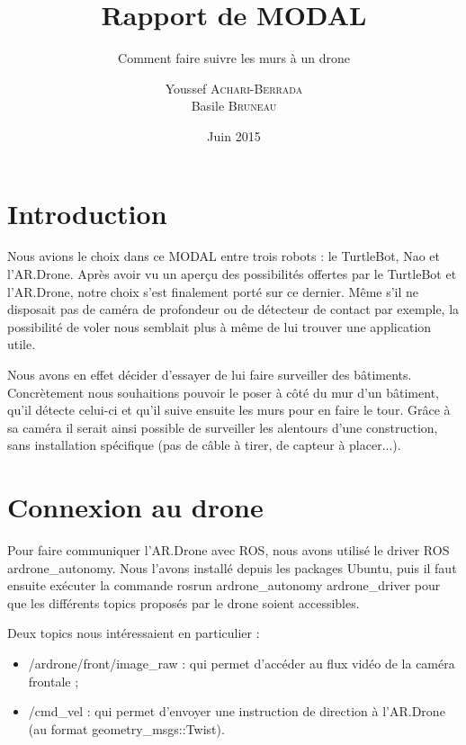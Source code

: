 \documentclass[titlepage,11pt,a4paper]{article}
\title{Rapport de MODAL}
\subtitle{Comment faire suivre les murs à un drone}
\author{Youssef \textsc{Achari-Berrada}\\
Basile \textsc{Bruneau}}
\date{Juin 2015}
\begin{document}
\maketitle



\section*{Introduction}
Nous avions le choix dans ce MODAL entre trois robots : le TurtleBot, Nao et l'AR.Drone. Après avoir vu un aperçu des possibilités offertes par le TurtleBot et l'AR.Drone, notre choix s'est finalement porté sur ce dernier. Même s'il ne disposait pas de caméra de profondeur ou de détecteur de contact par exemple, la possibilité de voler nous semblait plus à même de lui trouver une application utile.

Nous avons en effet décider d'essayer de lui faire surveiller des bâtiments. Concrètement nous souhaitions pouvoir le poser à côté du mur d'un bâtiment, qu'il détecte celui-ci et qu'il suive ensuite les murs pour en faire le tour. Grâce à sa caméra il serait ainsi possible de surveiller les alentours d'une construction, sans installation spécifique (pas de câble à tirer, de capteur à placer...).

\section{Connexion au drone}
Pour faire communiquer l'AR.Drone avec ROS, nous avons utilisé le driver ROS ardrone\_autonomy. Nous l'avons installé depuis les packages Ubuntu, puis il faut ensuite exécuter la commande rosrun ardrone\_autonomy ardrone\_driver pour que les différents topics proposés par le drone soient accessibles.

Deux topics nous intéressaient en particulier :
\begin{itemize}
	\item /ardrone/front/image\_raw : qui permet d'accéder au flux vidéo de la caméra frontale ;
	\item /cmd\_vel : qui permet d'envoyer une instruction de direction à l'AR.Drone (au format geometry\_msgs::Twist).
\end{itemize}
\end{document}
